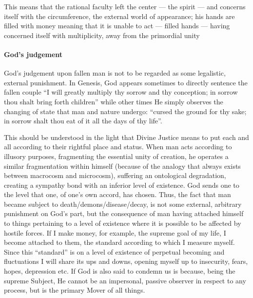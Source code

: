 This means that the rational faculty left the center --- the spirit --- and concerns itself with the circumference, the external world of appearance; his hands are filled with money meaning that it is unable to act --- filled hands --- having concerned itself with multiplicity, away from the primordial unity \paragraph{God's judgement}


God's judgement upon fallen man is not to be regarded as some legalistic, external punishment. In Genesis, God appears sometimes to directly sentence the fallen couple ``I will greatly multiply thy sorrow and thy conception; in sorrow thou shalt bring forth children'' while other times He simply observes the changing of state that man and nature undergo: ``cursed the ground for thy sake; in sorrow shalt thou eat of it all the days of thy life''.

This should be understood in the light that Divine Justice means to put each and all according to their rightful place and status. When man acts according to illusory purposes, fragmenting the essential unity of creation, he operates a similar fragmentation within himself (because of the analogy that always exists between macrocosm and microcosm), suffering an ontological degradation, creating a sympathy bond with an inferior level of existence. God sends one to the level that one, of one's own accord, has chosen. Thus, the fact that man became subject to death/demons/disease/decay, is not some external, arbitrary punishment on God's part, but the consequence of man having attached himself to things pertaining to a level of existence where it is possible to be affected by hostile forces. If I make money, for example, the supreme goal of my life, I become attached to them, the standard according to which I measure myself. Since this ``standard'' is on a level of existence of perpetual becoming and fluctuations I will share its ups and downs, opening myself up to insecurity, fears, hopes, depression etc. If God is also said to condemn us is because, being the supreme Subject, He cannot be an impersonal, passive observer in respect to any process, but is the primary Mover of all things.

